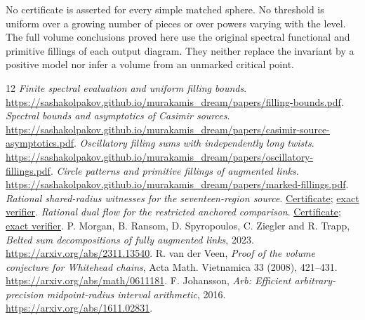 \documentclass[11pt]{article}
\numberwithin{equation}{section}
\theoremstyle{definition}\newtheorem{definition}[theorem]{Definition}
\theoremstyle{remark}\newtheorem{remark}[theorem]{Remark}
\begin{document}
No certificate is asserted for every simple matched sphere.
No threshold is uniform over a growing number of pieces or over
powers varying with the level. The full volume conclusions proved
here use the original spectral functional and primitive fillings
of each output diagram. They neither replace the invariant by a
positive model nor infer a volume from an unmarked critical point.

\begin{thebibliography}{12}
\emph{Finite spectral evaluation and uniform filling bounds}.
\url{https://sashakolpakov.github.io/murakamis_dream/papers/filling-bounds.pdf}.
 \emph{Spectral bounds and asymptotics of Casimir sources}.
\url{https://sashakolpakov.github.io/murakamis_dream/papers/casimir-source-asymptotics.pdf}.
\emph{Oscillatory filling sums with independently long twists}.
\url{https://sashakolpakov.github.io/murakamis_dream/papers/oscillatory-fillings.pdf}.
\emph{Circle patterns and primitive fillings of augmented links}.
\url{https://sashakolpakov.github.io/murakamis_dream/papers/marked-fillings.pdf}.
\emph{Rational shared-radius witnesses for the seventeen-region source}.
\href{https://github.com/sashakolpakov/murakamis_dream/blob/main/experiments/actual_sector_cover_certificate.json}{Certificate};
\href{https://github.com/sashakolpakov/murakamis_dream/blob/main/experiments/audit_actual_sector_cover.py}{exact verifier}.
\emph{Rational dual flow for the restricted anchored comparison}.
\href{https://github.com/sashakolpakov/murakamis_dream/blob/main/experiments/actual_shared_radius_anchor_obstruction_certificate.json}{Certificate};
\href{https://github.com/sashakolpakov/murakamis_dream/blob/main/experiments/audit_actual_shared_radius_anchor_obstruction.py}{exact verifier}.
 P. Morgan, B. Ransom, D. Spyropoulos, C. Ziegler and R. Trapp,
\emph{Belted sum decompositions of fully augmented links}, 2023.
\url{https://arxiv.org/abs/2311.13540}.
 R. van der Veen,
\emph{Proof of the volume conjecture for Whitehead chains},
Acta Math. Vietnamica 33 (2008), 421--431.
\url{https://arxiv.org/abs/math/0611181}.
 F. Johansson,
\emph{Arb: Efficient arbitrary-precision midpoint-radius interval arithmetic},
2016. \url{https://arxiv.org/abs/1611.02831}.
\end{thebibliography}
\end{document}
